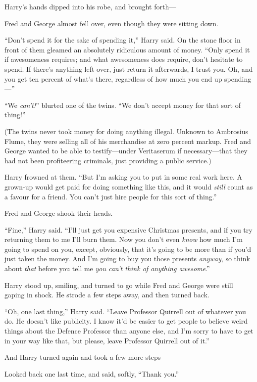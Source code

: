 Harry’s hands dipped into his robe, and brought forth—

Fred and George almost fell over, even though they were sitting down.

“Don’t spend it for the sake of spending it,” Harry said. On the stone floor in front of them gleamed an absolutely ridiculous amount of money. “Only spend it if awesomeness requires; and what awesomeness does require, don’t hesitate to spend. If there’s anything left over, just return it afterwards, I trust you. Oh, and you get ten percent of what’s there, regardless of how much you end up spending—”

“We \emph{can’t!}” blurted one of the twins. “We don’t accept money for that sort of thing!”

(The twins never took money for doing anything illegal. Unknown to Ambrosius Flume, they were selling all of his merchandise at zero percent markup. Fred and George wanted to be able to testify—under Veritaserum if necessary—that they had not been profiteering criminals, just providing a public service.)

Harry frowned at them. “But I’m asking you to put in some real work here. A grown-up would get paid for doing something like this, and it would \emph{still} count as a favour for a friend. You can’t just hire people for this sort of thing.”

Fred and George shook their heads.

“Fine,” Harry said. “I’ll just get you expensive Christmas presents, and if you try returning them to me I’ll burn them. Now you don’t even \emph{know} how much I’m going to spend on you, except, obviously, that it’s going to be more than if you’d just taken the money. And I’m going to buy you those presents \emph{anyway}, so think about \emph{that} before you tell me \emph{you can’t think of anything awesome}.”

Harry stood up, smiling, and turned to go while Fred and George were still gaping in shock. He strode a few steps away, and then turned back.

“Oh, one last thing,” Harry said. “Leave Professor Quirrell out of whatever you do. He doesn’t like publicity. I know it’d be easier to get people to believe weird things about the Defence Professor than anyone else, and I’m sorry to have to get in your way like that, but please, leave Professor Quirrell out of it.”

And Harry turned again and took a few more steps—

Looked back one last time, and said, softly, “Thank you.”

